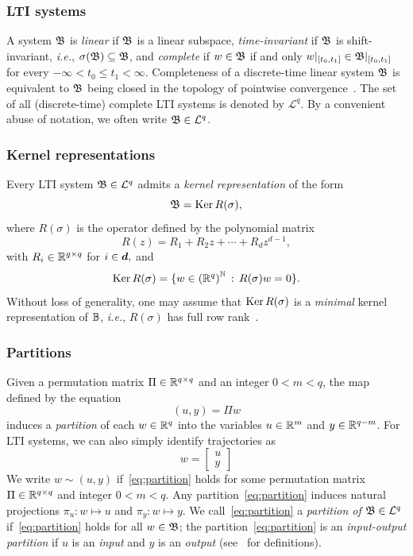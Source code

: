  \subsubsection{LTI systems}
 A system $\mathfrak{B}$ is \textit{linear} if $\mathfrak{B}$ is a linear subspace, \textit{time-invariant} if $\mathfrak{B}$ is shift-invariant, \textit{i.e.}, ${\sigma(\mathfrak{B}) \subseteq \mathfrak{B}}$, and \textit{complete} if ${w\in\mathfrak{B}}$ if and only ${w|_{[t_0,t_1]} \in \mathfrak{B}|_{[t_0,t_1]}}$ for every ${-\infty < t_0 \le t_1 < \infty}$. Completeness of a discrete-time linear system $\mathfrak{B}$ is equivalent  to $\mathfrak{B}$ being closed in the topology of pointwise convergence~\cite[Proposition 4]{willems1986}. The set of all (discrete-time) complete LTI systems is denoted by $\mathcal{L}^q$.  By a convenient abuse of notation, we often write $\mathfrak{B} \in \mathcal{L}^{q}$.


 \subsubsection{Kernel representations}
 Every LTI system ${\mathfrak{B} \in \mathcal{L}^{q}}$ admits a \textit{kernel representation} of the form
 \begin{equation}
 \mathfrak{B} = \operatorname{Ker} R(\sigma) ,
 \end{equation}
 where  $R(\sigma)$ is the operator defined by the polynomial matrix 
\[
R(z) = R_1 + R_2 z + \cdots + R_{d}z^{d-1},
\]
 with $R_i\in\mathbb{R}^{g\times q}$ for $i\in\text{\boldmath$d$\unboldmath},$ and 
 \[
   \operatorname{Ker} R(\sigma) = \{w\in{(\mathbb{R}^q)}^{\mathbb{N}} \,:\, R(\sigma)w = 0\}.
 \]
 Without loss of generality, one may assume that  $\operatorname{Ker} R(\sigma)$  is a \emph{minimal}  kernel representation of $\mathbb{B}$,  \textit{i.e.},  $R(\sigma)$ has full row rank~\cite{willems1989}.


 \subsubsection{Partitions}
 Given a permutation matrix ${\Pi\in\mathbb{R}^{q\times q}}$ and an integer $0 < m < q$, the map defined by the equation
 \begin{equation} \label{eq:partition} 
 (u,y) = \Pi w 
 \end{equation}
 induces a \textit{partition} of each ${w\in\mathbb{R}^q}$ into the variables ${u\in\mathbb{R}^m}$ and ${y\in\mathbb{R}^{q-m}}$.  For LTI systems, we can also simply identify trajectories as 
 \begin{equation} \label{eq:partition_lti}
   w = \begin{bmatrix}
      u \\
      y
   \end{bmatrix}
 \end{equation}
 We write $w \sim (u,y)$ if~\eqref{eq:partition} holds for some  permutation matrix ${\Pi\in\mathbb{R}^{q\times q}}$ and integer ${0 < m < q}$.  
 Any partition~\eqref{eq:partition} induces natural  projections  ${ \pi_u:  w \mapsto u}$ and ${ \pi_y:  w \mapsto y}$. We call~\eqref{eq:partition} a \textit{partition of ${\mathfrak{B}\in\mathcal{L}^{q}}$} if~\eqref{eq:partition} holds for all ${w\in\mathfrak{B}}$; the partition~\eqref{eq:partition} is an \textit{input-output partition} if $u$ is an \textit{input} and $y$ is an \textit{output} (see~\cite[p.568]{willems1986} for definitions).

